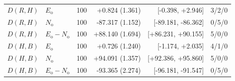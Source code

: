 \begin{longtable}{lllrrr}
$D(R,H)$ & $E_{\mathrm{o}}$ & 100 & +0.824 (1.361) & [-0.398, +2.946] & 3/2/0\\
$D(R,H)$ & $N_{\mathrm{o}}$ & 100 & -87.317 (1.152) & [-89.181, -86.362] & 0/5/0\\
$D(R,H)$ & $E_{\mathrm{o}}-N_{\mathrm{o}}$ & 100 & +88.140 (1.694) & [+86.231, +90.155] & 5/0/0\\
$D(H,B)$ & $E_{\mathrm{o}}$ & 100 & +0.726 (1.240) & [-1.174, +2.035] & 4/1/0\\
$D(H,B)$ & $N_{\mathrm{o}}$ & 100 & +94.091 (1.357) & [+92.386, +95.860] & 5/0/0\\
$D(H,B)$ & $E_{\mathrm{o}}-N_{\mathrm{o}}$ & 100 & -93.365 (2.274) & [-96.181, -91.547] & 0/5/0\\
\bottomrule
\end{longtable}
\endgroup
